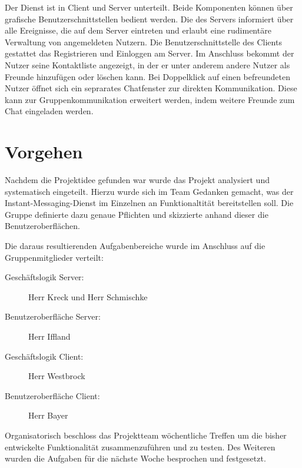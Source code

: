 \documentclass[12pt,a4paper,bibliography=totocnumbered,listof=totocnumbered]{scrartcl}
\begin{document}
Der Dienst ist in Client und Server unterteilt. Beide Komponenten können über grafische Benutzerschnittstellen bedient werden. Die des Servers informiert über alle Ereignisse, die auf dem Server eintreten und erlaubt eine rudimentäre Verwaltung von angemeldeten Nutzern. 
Die Benutzerschnittstelle des Clients gestattet das Registrieren und Einloggen am Server. Im Anschluss bekommt der Nutzer seine Kontaktliste angezeigt, in der er unter anderem andere Nutzer als Freunde hinzufügen oder löschen kann. Bei Doppelklick auf einen befreundeten Nutzer öffnet sich ein seprarates Chatfenster zur direkten Kommunikation. Diese kann zur Gruppenkommunikation erweitert werden, indem weitere Freunde zum Chat eingeladen werden.


\newpage
\section{Vorgehen}
Nachdem die Projektidee gefunden war wurde das Projekt analysiert und systematisch eingeteilt. Hierzu wurde sich im Team Gedanken gemacht, was 
der Instant-Messaging-Dienst im Einzelnen an Funktionaltität bereitstellen 
soll. Die Gruppe definierte dazu genaue Pflichten und skizzierte anhand dieser die Benutzeroberflächen.

Die daraus resultierenden Aufgabenbereiche wurde im Anschluss auf die Gruppenmitglieder verteilt: 
\begin{description}
	\item[Geschäftslogik Server:] Herr Kreck und Herr Schmischke
	\item[Benutzeroberfläche Server:] Herr Iffland
	\item[Geschäftslogik Client:] Herr Westbrock
	\item[Benutzeroberfläche Client:] Herr Bayer 
\end{description}

Organisatorisch beschloss das Projektteam wöchentliche Treffen um die bisher
entwickelte Funktionalität zusammenzuführen und zu testen. Des Weiteren wurden
die Aufgaben für die nächste Woche besprochen und festgesetzt.

\newpage
\end{document}
